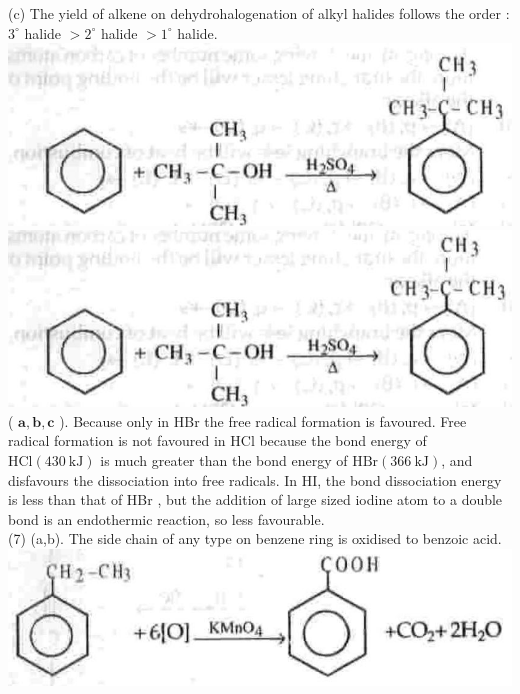 \documentclass[10pt]{article}
\begin{document}
(c) The yield of alkene on dehydrohalogenation of alkyl halides follows the order : $3^{\circ}$ halide $>2^{\circ}$ halide $>1^{\circ}$ halide.\\
\includegraphics[max width=\textwidth, center]{2025_01_28_8470952b98110cec3aabg-245(2)}\\
\includegraphics[max width=\textwidth, center]{2025_01_28_8470952b98110cec3aabg-245(4)}\\
( $\mathbf{a}, \mathbf{b}, \mathbf{c}$ ). Because only in HBr the free radical formation is favoured. Free radical formation is not favoured in HCl because the bond energy of $\mathrm{HCl}(430 \mathrm{~kJ})$ is much greater than the bond energy of $\mathrm{HBr}(366 \mathrm{~kJ})$, and disfavours the dissociation into free radicals. In HI, the bond dissociation energy is less than that of HBr , but the addition of large sized iodine atom to a double bond is an endothermic reaction, so less favourable.\\
(7) (a,b). The side chain of any type on benzene ring is oxidised to benzoic acid.\\
\includegraphics[max width=\textwidth, center]{2025_01_28_8470952b98110cec3aabg-245(6)}\\
\end{document}
